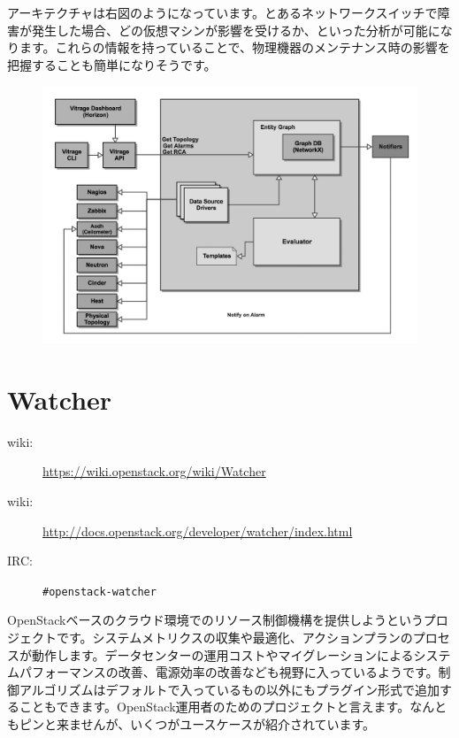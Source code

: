 アーキテクチャは右図のようになっています。とあるネットワークスイッチで障害が発生した場合、どの仮想マシンが影響を受けるか、といった分析が可能になります。これらの情報を持っていることで、物理機器のメンテナンス時の影響を把握することも簡単になりそうです。

\begin{figure}[htb]
	\begin{center}
		\includegraphics[width=\textwidth]{img/Vitrage-high_level_architecture2.png}
	\end{center}
\end{figure}

\section{Watcher}

\begin{description}
	\item[wiki:] \url{https://wiki.openstack.org/wiki/Watcher}
	\item[wiki:] \url{http://docs.openstack.org/developer/watcher/index.html}
	\item[IRC:] \verb|#openstack-watcher|
\end{description}

OpenStackベースのクラウド環境でのリソース制御機構を提供しようというプロジェクトです。システムメトリクスの収集や最適化、アクションプランのプロセスが動作します。データセンターの運用コストやマイグレーションによるシステムパフォーマンスの改善、電源効率の改善なども視野に入っているようです。制御アルゴリズムはデフォルトで入っているもの以外にもプラグイン形式で追加することもできます。OpenStack運用者のためのプロジェクトと言えます。なんともピンと来ませんが、いくつがユースケースが紹介されています。

